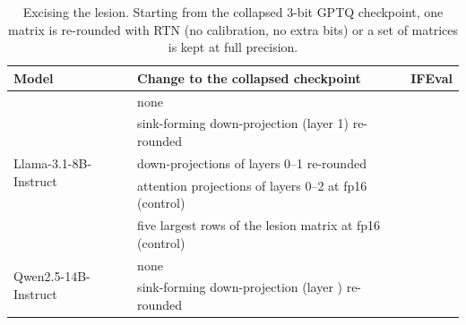 \begin{table}[t]
\caption{Excising the lesion. Starting from the collapsed 3-bit GPTQ checkpoint, one matrix is re-rounded with RTN (no calibration, no extra bits) or a set of matrices is kept at full precision.}
\label{tab:lesion}
\begin{center}
\small
\begin{tabular}{llc}
\toprule
Model & Change to the collapsed checkpoint & IFEval \\
\midrule
\multirow{5}{*}{Llama-3.1-8B-Instruct}
 & none                                                    & \LgptqIF{} \\
 & sink-forming down-projection (layer 1) re-rounded       & \LoneMatrixIF{} \\
 & down-projections of layers 0--1 re-rounded             & \LzeroBitIF{} \\
 & attention projections of layers 0--2 at fp16 (control) & \LearlyAttnIF{} \\
 & five largest rows of the lesion matrix at fp16 (control) & \LswRowsIF{} \\
\midrule
\multirow{2}{*}{Qwen2.5-14B-Instruct}
 & none                                                    & \QgptqIF{} \\
 & sink-forming down-projection (layer \QlesionLayer{}) re-rounded & \QoneMatrixIF{} \\
\bottomrule
\end{tabular}
\end{center}
\end{table}
